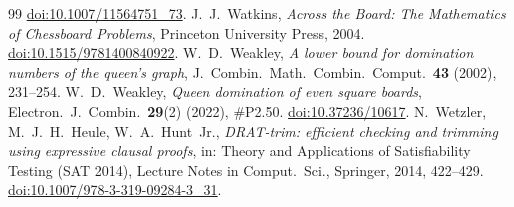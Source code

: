 \documentclass[11pt]{article}
\theoremstyle{definition}
\theoremstyle{remark}
\begin{document}
\begin{thebibliography}{99}
\href{https://doi.org/10.1007/11564751_73}{doi:10.1007/11564751\_73}.
 J.~J.~Watkins, \emph{Across the Board: The Mathematics of Chessboard Problems}, Princeton
University Press, 2004. \href{https://doi.org/10.1515/9781400840922}{doi:10.1515/9781400840922}.
 W.~D.~Weakley, \emph{A lower bound for domination numbers of the queen's graph},
J.\ Combin.\ Math.\ Combin.\ Comput.\ \textbf{43} (2002), 231--254.
 W.~D.~Weakley, \emph{Queen domination of even square boards}, Electron.\ J.\ Combin.\
\textbf{29}(2) (2022), \#P2.50.
\href{https://doi.org/10.37236/10617}{doi:10.37236/10617}.
 N.~Wetzler, M.~J.~H.~Heule, W.~A.~Hunt~Jr., \emph{DRAT-trim: efficient checking and
trimming using expressive clausal proofs}, in: Theory and Applications of Satisfiability Testing (SAT 2014),
Lecture Notes in Comput.\ Sci., Springer, 2014, 422--429.
\href{https://doi.org/10.1007/978-3-319-09284-3_31}{doi:10.1007/978-3-319-09284-3\_31}.
\end{thebibliography}
\end{document}
